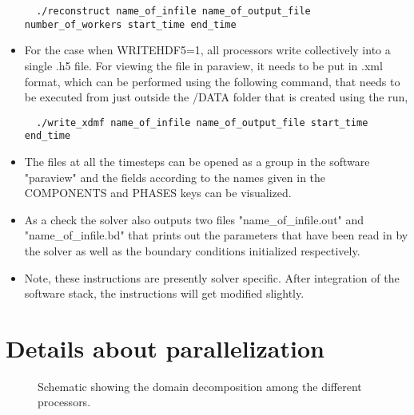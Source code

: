 \documentclass[a4paper,10pt]{article}
\begin{document}
\begin{itemize}
\begin{lstlisting}
  ./reconstruct name_of_infile name_of_output_file number_of_workers start_time end_time 
 \end{lstlisting}
 \item For the case when WRITEHDF5=1, all processors write collectively into a single .h5 file. For viewing the file in 
 paraview, it needs to be put in .xml format, which can be performed using the following command, that needs to be
 executed from just outside the /DATA folder that is created using the run,
 \begin{lstlisting}
  ./write_xdmf name_of_infile name_of_output_file start_time end_time
 \end{lstlisting}
 \item The files at all the timesteps can be opened as a group in the software "paraview" and the fields according to the names given in the COMPONENTS and PHASES keys can be visualized.
 \item As a check the solver also outputs two files "name\_of\_infile.out" and "name\_of\_infile.bd" that prints out the parameters that have been read in by the solver as well as the 
 boundary conditions initialized respectively.
 \item Note, these instructions are presently solver specific. After integration of the software stack, 
 the instructions will get modified slightly.
\end{itemize}

\section{Details about parallelization}
\begin{figure}[!htbp]
\centering
{}
\caption{Schematic showing the domain decomposition among the different processors.}
\label{Domain_decomposition}
\end{figure}
\end{document}

